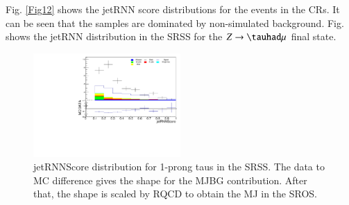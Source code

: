 \begin{table}[]
{	\label{tab:MJ}
}





\end{table}

Fig. \ref{Fig12} shows the jetRNN score distributions for the events in the CRs. It can be seen that the samples are dominated by non-simulated background. Fig. shows the jetRNN distribution in the SRSS for the $Z\to\tauhad\mu$ final state.

\begin{figure}[htbp]
	\centering
	\includegraphics[width=0.5\textwidth]{figures/Fig21}
	\caption{jetRNNScore distribution for 1-prong taus in the SRSS. The data to MC difference gives the shape for the MJBG contribution. After that, the shape is scaled by RQCD to obtain the MJ in the SROS.}
	\label{Fig21}
\end{figure}

